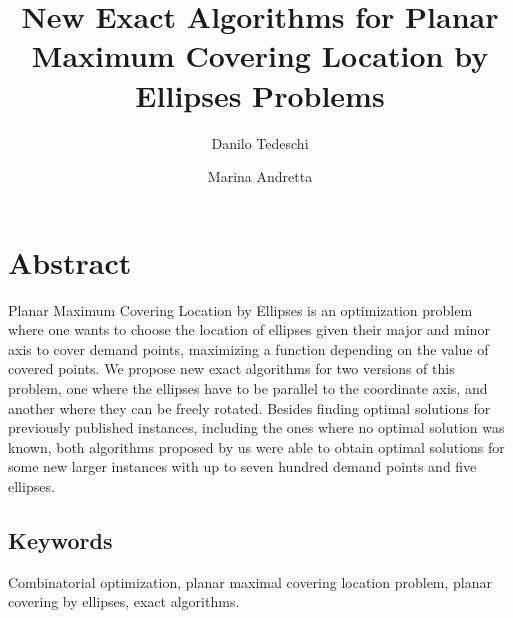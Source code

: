 \documentclass[3p, 11pt]{elsarticle}
\begin{document}
	
	\begin{frontmatter}
		
		
		\title{New Exact Algorithms for Planar Maximum Covering Location by Ellipses Problems}
		
		\author[add1]{Danilo Tedeschi}

		
		\author[add1]{Marina Andretta}
					
		\address[add1]{Departamento de Matemática Aplicada e Estatística, Instituto de Ciências Matemáticas e de Computação, Universidade de São Paulo, Avenida Trabalhador São-carlense, 400, Centro, 13566-590, São Carlos, SP, Brazil.}
		
\end{frontmatter}
\clearpage

\section*{Abstract}
			
			{\color{Red}
		Planar Maximum Covering Location by Ellipses is an optimization problem where one wants to choose the location of ellipses given their major and minor axis to cover demand points, maximizing a function depending on the value of covered points.	
		}We propose new exact algorithms for two versions of this problem, one where the ellipses have to be parallel to the coordinate axis, and another where they can be freely rotated. 
			Besides finding optimal solutions for previously published instances, including the ones where no optimal solution was known, both algorithms proposed by us were able to obtain optimal solutions for some new larger instances 	with up to seven hundred demand points and five ellipses.
\subsection*{Keywords}
			Combinatorial optimization, planar maximal covering location problem, planar covering by ellipses, exact algorithms.
			
			
\end{document}
